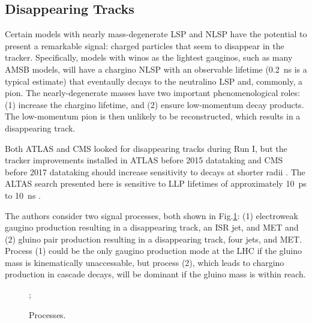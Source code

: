 \documentclass[12pt]{article}
\begin{document}
    \subsection{Disappearing Tracks}
        Certain models with nearly mass-degenerate LSP and NLSP have the potential to present a remarkable signal: charged particles that seem to disappear in the tracker. Specifically, models with winos as the lightest gauginos, such as many AMSB models, will have a chargino NLSP with an observable lifetime (\SI{0.2}{\nano\s} is a typical estimate) that eventaully decays to the neutralino LSP and, commonly, a pion. The nearly-degenerate masses have two important phenomenological roles: (1) increase the chargino lifetime, and (2) ensure low-momentum decay products. The low-momentum pion is then unlikely to be reconstructed, which results in a disappearing track.

        Both ATLAS and CMS looked for disappearing tracks during Run I, but the tracker improvements installed in ATLAS before 2015 datataking and CMS before 2017 datataking should increase sensitivity to decays at shorter radii . The ALTAS search presented here is sensitive to LLP lifetimes of approximately \SI{10}{\pico\s} to \SI{10}{\nano\s} .

        The authors consider two signal processes, both shown in Fig.\ref{disappearing_processes}: (1) electroweak gaugino production resulting in a disappearing track, an ISR jet, and MET and (2) gluino pair production resulting in a disappearing track, four jets, and MET. Process (1) could be the only gaugino production mode at the LHC if the gluino mass is kinematically unaccessable, but process (2), which leads to chargino production in cascade decays, will be dominant if the gluino mass is within reach.

        \noindent \begin{figure}[htbp] \begin{center}
        ;
        \caption{Processes.}
        \label{disappearing_processes}
        \end{center} \end{figure}
\end{document}
